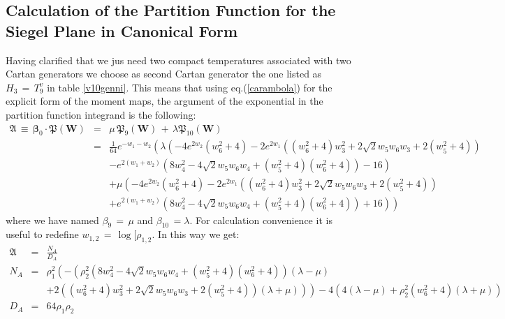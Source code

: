 \documentclass[10pt,a4paper]{article}
\begin{document}
\subsection{Calculation of the Partition Function for the Siegel Plane in Canonical Form}
Having clarified that we jus need two compact temperatures associated with two Cartan generators we choose as second Cartan generator the one listed as $H_3\, = \, T^v_9$ in table \ref{v10genni}. This means that using eq.(\ref{carambola}) for the explicit form of the moment maps, the argument of the exponential in the partition function integrand is the following:
\begin{eqnarray}\label{planetario}
 \mathfrak{A}\, \equiv \, \boldsymbol{\beta}_0\cdot \boldsymbol{\mathfrak{P}}(\mathbf{W}) & = & \mu \, \boldsymbol{\mathfrak{P}}_9(\mathbf{W}) \, + \,  \lambda
  \boldsymbol{\mathfrak{P}}_{10}(\mathbf{W}) \nonumber\\
  &=&\frac{1}{64} e^{-w_1-w_2} \left(\lambda
   \left(-4 e^{2 w_2} \left(w_6^2+4\right)-2
   e^{2 w_1} \left(\left(w_6^2+4\right)
   w_3^2+2 \sqrt{2} w_5 w_6 w_3+2
   \left(w_5^2+4\right)\right)\right.\right. \nonumber\\
   &&\left.\left.-e^{2
   \left(w_1+w_2\right)} \left(8 w_4^2-4
   \sqrt{2} w_5 w_6 w_4+\left(w_5^2+4\right)
   \left(w_6^2+4\right)\right)-16\right)\right.\nonumber\\
   &&\left. +\mu
   \left(-4 e^{2 w_2} \left(w_6^2+4\right)-2
   e^{2 w_1} \left(\left(w_6^2+4\right)
   w_3^2+2 \sqrt{2} w_5 w_6 w_3+2
   \left(w_5^2+4\right)\right)\right.\right.\nonumber\\
   &&\left.\left.  +e^{2
   \left(w_1+w_2\right)} \left(8 w_4^2-4
   \sqrt{2} w_5 w_6 w_4+\left(w_5^2+4\right)
   \left(w_6^2+4\right)\right)+16\right)\right)
\end{eqnarray}
where we have named $\beta_9 \, = \, \mu$ and $\beta_{10} \, = \lambda$. For calculation convenience it is
useful to redefine $w_{1,2} \, = \, \log[\rho_{1,2}$. In this way we get:
\begin{eqnarray}
\label{acco}
  \mathfrak{A} &=&\frac{N_A}{D_A} \nonumber\\
  N_A&=& \rho _1^2 \left(-\left(\rho _2^2 \left(8
   w_4^2-4 \sqrt{2} w_5 w_6
   w_4+\left(w_5^2+4\right)
   \left(w_6^2+4\right)\right) (\lambda -\mu
   )\right.\right. \nonumber\\
  &&\left.\left.  +2 \left(\left(w_6^2+4\right) w_3^2+2
   \sqrt{2} w_5 w_6 w_3+2
   \left(w_5^2+4\right)\right) (\lambda +\mu
   )\right)\right)-4 \left(4 (\lambda -\mu
   )+\rho _2^2 \left(w_6^2+4\right) (\lambda
   +\mu )\right)  \nonumber\\
   D_A &= & 64 \rho _1 \rho _2 \nonumber\\
\end{eqnarray}
\end{document}
